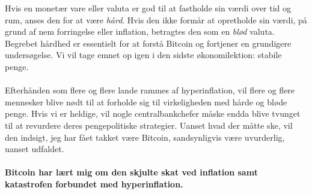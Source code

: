 \documentclass[paper=6in:9in,pagesize=pdftex,headinclude=on,footinclude=on,12pt]{scrbook}
\begin{document}
Hvis en monetær vare eller valuta er god til at fastholde sin værdi over tid og rum, anses den for at være \textit{hård}. Hvis den ikke formår at opretholde sin værdi, på grund af nem forringelse eller inflation, betragtes den som en \textit{blød} valuta. Begrebet hårdhed er essentielt for at forstå Bitcoin og fortjener en grundigere undersøgelse. Vi vil tage emnet op igen i den sidste økonomilektion: stabile penge.\paragraph{} Efterhånden som flere og flere lande rammes af hyperinflation, vil flere og flere mennesker blive nødt til at forholde sig til virkeligheden med hårde og bløde penge. Hvis vi er heldige, vil nogle centralbankchefer måske endda blive tvunget til at revurdere deres pengepolitiske strategier. Uanset hvad der måtte ske, vil den indsigt, jeg har fået takket være Bitcoin, sandsynligvis være uvurderlig, uanset udfaldet.\paragraph{Bitcoin har lært mig om den skjulte skat ved inflation samt katastrofen forbundet med hyperinflation.}%
%
%
%
%
%
\end{document}
